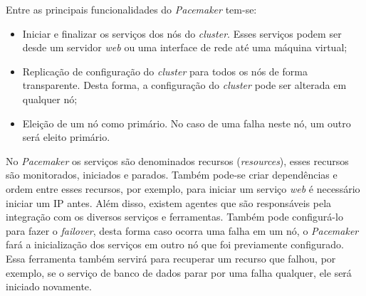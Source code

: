 Entre as principais funcionalidades do \textit{Pacemaker} tem-se:
\begin{itemize}
 \item Iniciar e finalizar os serviços dos nós do \textit{cluster}. Esses serviços podem ser desde um servidor \textit{web} ou uma interface de 
 rede até uma máquina virtual;
 \item Replicação de configuração do \textit{cluster} para todos os nós de forma transparente. Desta forma, a configuração do \textit{cluster} 
 pode ser alterada em qualquer nó;
 \item Eleição de um nó como primário. No caso de uma falha neste nó, um outro será eleito primário.
\end{itemize}

No \textit{Pacemaker} os serviços são denominados recursos (\textit{resources}), esses recursos são monitorados, iniciados e parados.
Também pode-se criar dependências e ordem entre esses recursos, por exemplo, para iniciar um serviço \textit{web} é necessário iniciar 
um \ac{IP} antes. Além disso, existem agentes que são responsáveis pela integração com os diversos serviços e ferramentas. 
Também pode configurá-lo para fazer o \textit{failover}, desta forma caso ocorra uma falha em um nó, o \textit{Pacemaker} fará a inicialização 
dos serviços em outro nó que foi previamente configurado. Essa ferramenta também servirá para recuperar um recurso que falhou, por exemplo, se 
o serviço de banco de dados parar por uma falha qualquer, ele será iniciado novamente.


